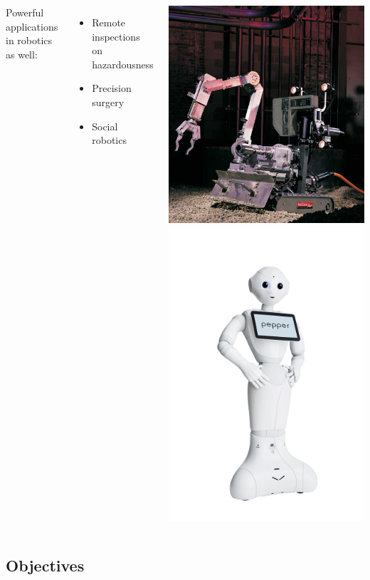 \documentclass[11pt]{beamer}
\begin{document}
\begin{frame}[allowframebreaks]
		\begin{columns}
			Powerful applications in robotics as well:
			\begin{itemize}
				\item Remote inspections on hazardousness
				\item Precision surgery
				\item Social robotics
			\end{itemize}
			\includegraphics[width=0.5\linewidth]{pioneer_chernobyl} \\
			\vspace{0.5cm}
			\hfill
			\includegraphics[width=0.5\linewidth]{pepper}
		\end{columns}
\end{frame}

\subsection{Objectives}
\end{document}
